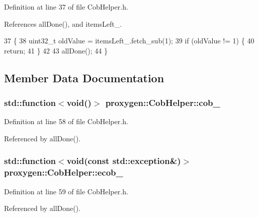 Definition at line 37 of file Cob\+Helper.\+h.



References all\+Done(), and items\+Left\+\_\+.


\begin{DoxyCode}
37                     \{
38     uint32\_t oldValue = itemsLeft_.fetch\_sub(1);
39     \textcolor{keywordflow}{if} (oldValue != 1) \{
40       \textcolor{keywordflow}{return};
41     \}
42 
43     allDone();
44   \}
\end{DoxyCode}


\subsection{Member Data Documentation}
\subsubsection[{cob\+\_\+}]{\setlength{\rightskip}{0pt plus 5cm}std\+::function$<$void()$>$ proxygen\+::\+Cob\+Helper\+::cob\+\_\+\hspace{0.3cm}{\ttfamily [private]}}\label{classproxygen_1_1CobHelper_a38d33b75ab511aa394efde8c12d94b2f}


Definition at line 58 of file Cob\+Helper.\+h.



Referenced by all\+Done().

\subsubsection[{ecob\+\_\+}]{\setlength{\rightskip}{0pt plus 5cm}std\+::function$<$void(const std\+::exception\&)$>$ proxygen\+::\+Cob\+Helper\+::ecob\+\_\+\hspace{0.3cm}{\ttfamily [private]}}\label{classproxygen_1_1CobHelper_a0cb8c27b4ef2b871ee509510ff6ff6ac}


Definition at line 59 of file Cob\+Helper.\+h.



Referenced by all\+Done().

